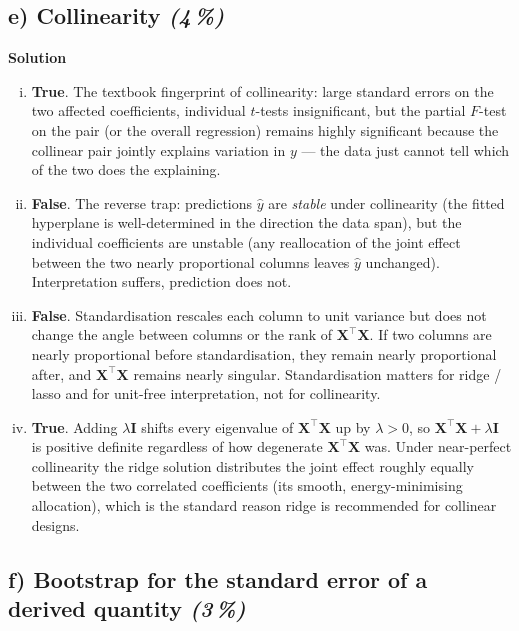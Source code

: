 \documentclass[11pt,a4paper]{article}
\newcommand{\subpoints}[1]{\textit{(#1\,\%)}}
\newcommand{\sol}{\noindent\textbf{Solution}}
\begin{document}
\subsection*{e) Collinearity \subpoints{4}}
\sol{}
\begin{enumerate}[(i)]
  \item \textbf{True}. The textbook fingerprint of collinearity: large standard errors on the two
        affected coefficients, individual $t$-tests insignificant, but the partial $F$-test on
        the pair (or the overall regression) remains highly significant because the collinear pair
        jointly explains variation in $y$ --- the data just cannot tell which of the two does the
        explaining.
  \item \textbf{False}. The reverse trap: predictions $\hat y$ are \emph{stable} under collinearity
        (the fitted hyperplane is well-determined in the direction the data span), but the
        individual coefficients are unstable (any reallocation of the joint effect between the two
        nearly proportional columns leaves $\hat y$ unchanged). Interpretation suffers, prediction
        does not.
  \item \textbf{False}. Standardisation rescales each column to unit variance but does not change
        the angle between columns or the rank of $\mathbf X^\top\mathbf X$. If two columns are
        nearly proportional before standardisation, they remain nearly proportional after, and
        $\mathbf X^\top\mathbf X$ remains nearly singular. Standardisation matters for ridge / lasso
        and for unit-free interpretation, not for collinearity.
  \item \textbf{True}. Adding $\lambda\mathbf I$ shifts every eigenvalue of $\mathbf X^\top\mathbf X$
        up by $\lambda > 0$, so $\mathbf X^\top\mathbf X + \lambda\mathbf I$ is positive definite
        regardless of how degenerate $\mathbf X^\top\mathbf X$ was. Under near-perfect
        collinearity the ridge solution distributes the joint effect roughly equally between the
        two correlated coefficients (its smooth, energy-minimising allocation), which is the
        standard reason ridge is recommended for collinear designs.
\end{enumerate}

\subsection*{f) Bootstrap for the standard error of a derived quantity \subpoints{3}}
\end{document}
